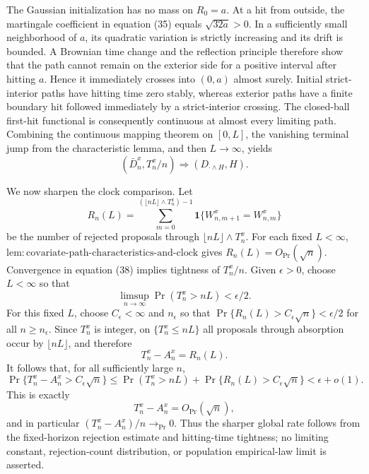 The Gaussian initialization has no mass on \(R_0=a\). At a hit from outside, the martingale coefficient in equation (35) equals \(\sqrt{32a}>0\). In a sufficiently small neighborhood of \(a\), its quadratic variation is strictly increasing and its drift is bounded. A Brownian time change and the reflection principle therefore show that the path cannot remain on the exterior side for a positive interval after hitting \(a\). Hence it immediately crosses into \((0,a)\) almost surely. Initial strict-interior paths have hitting time zero stably, whereas exterior paths have a finite boundary hit followed immediately by a strict-interior crossing. The closed-ball first-hit functional is consequently continuous at almost every limiting path. Combining the continuous mapping theorem on \([0,L]\), the vanishing terminal jump from the characteristic lemma, and then \(L\to\infty\), yields
\[
 (\bar D_n^x,T_n^x/n)\Rightarrow(D_{\cdot\wedge H},H). \tag{38}
\]

We now sharpen the clock comparison. Let
\[
 R_n(L)=\sum_{m=0}^{(\lfloor nL\rfloor\wedge T_n^x)-1}
 \mathbf 1\{W^x_{n,m+1}=W^x_{n,m}\}
\]
be the number of rejected proposals through \(\lfloor nL\rfloor\wedge T_n^x\). For each fixed \(L<\infty\),
\(\mathrm{lem{:}covariate\mbox{-}path\mbox{-}characteristics\mbox{-}and\mbox{-}clock}\) gives
\(R_n(L)=O_{\Pr}(\sqrt n)\). Convergence in equation (38) implies tightness of \(T_n^x/n\). Given \(\epsilon>0\), choose \(L<\infty\) so that
\[
 \limsup_{n\to\infty}\Pr(T_n^x>nL)<\epsilon/2. \tag{39}
\]
For this fixed \(L\), choose \(C_\epsilon<\infty\) and \(n_\epsilon\) so that
\(\Pr\{R_n(L)>C_\epsilon\sqrt n\}<\epsilon/2\) for all \(n\ge n_\epsilon\). Since \(T_n^x\) is integer, on \(\{T_n^x\le nL\}\) all proposals through absorption occur by \(\lfloor nL\rfloor\), and therefore
\[
 T_n^x-A_n^x=R_n(L).
\]
It follows that, for all sufficiently large \(n\),
\[
 \Pr\{T_n^x-A_n^x>C_\epsilon\sqrt n\}
 \le \Pr(T_n^x>nL)+\Pr\{R_n(L)>C_\epsilon\sqrt n\}<\epsilon+o(1). \tag{40}
\]
This is exactly
\[
 T_n^x-A_n^x=O_{\Pr}(\sqrt n), \tag{41}
\]
and in particular \((T_n^x-A_n^x)/n\to_{\Pr}0\). Thus the sharper global rate follows from the fixed-horizon rejection estimate and hitting-time tightness; no limiting constant, rejection-count distribution, or population empirical-law limit is asserted.

